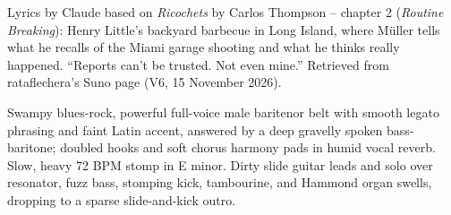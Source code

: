 
\begin{notes}
Lyrics by Claude based on \emph{Ricochets} by Carlos Thompson -- chapter 2 (\emph{Routine Breaking}): Henry Little's backyard barbecue in Long Island, where Müller tells what he recalls of the Miami garage shooting and what he thinks really happened. ``Reports can't be trusted. Not even mine.'' Retrieved from rataflechera's Suno page (V6, 15 November 2026).
\end{notes}
\begin{style}
Swampy blues-rock, powerful full-voice male baritenor belt with smooth legato phrasing and faint Latin accent, answered by a deep gravelly spoken bass-baritone; doubled hooks and soft chorus harmony pads in humid vocal reverb. Slow, heavy 72 BPM stomp in E minor. Dirty slide guitar leads and solo over resonator, fuzz bass, stomping kick, tambourine, and Hammond organ swells, dropping to a sparse slide-and-kick outro.
\end{style}
